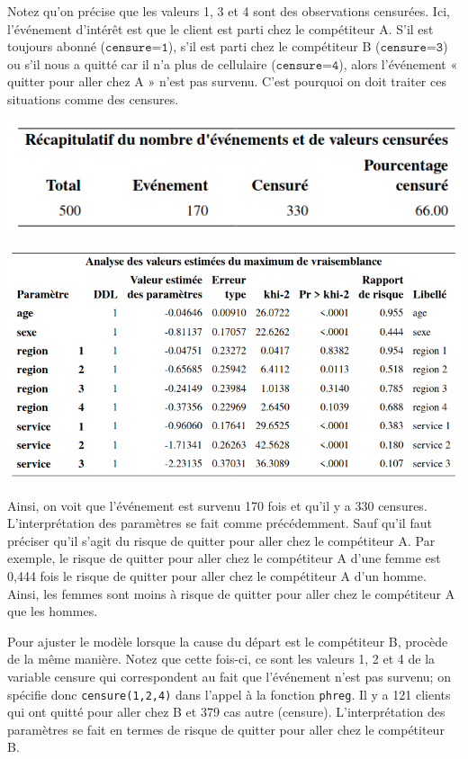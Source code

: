 \documentclass[
  11pt,
  letterpaper,
]{book}
\theoremstyle{definition}
\theoremstyle{definition}
\theoremstyle{definition}
\theoremstyle{definition}
\theoremstyle{remark}
\begin{document}
Notez qu'on précise que les valeurs 1, 3 et 4 sont des observations censurées. Ici, l'événement d'intérêt est que le client est parti chez le compétiteur A. S'il est toujours abonné (\(\texttt{censure=1}\)), s'il est parti chez le compétiteur B (\(\texttt{censure=3}\)) ou s'il nous a quitté car il n'a plus de cellulaire (\(\texttt{censure=4}\)), alors l'événement « quitter pour aller chez A » n'est pas survenu. C'est pourquoi on doit traiter ces situations comme des censures.

\begin{center}\includegraphics[width=0.65\linewidth]{figures/05-survie-e24} \end{center}

\begin{center}\includegraphics[width=0.85\linewidth]{figures/05-survie-e25} \end{center}

Ainsi, on voit que l'événement est survenu 170 fois et qu'il y a 330 censures. L'interprétation des paramètres se fait comme précédemment. Sauf qu'il faut préciser qu'il s'agit du risque de quitter pour aller chez le compétiteur A. Par exemple, le risque de quitter pour aller chez le compétiteur A d'une femme est 0,444 fois le risque de quitter pour aller chez le compétiteur A d'un homme. Ainsi, les femmes sont moins à risque de quitter pour aller chez le compétiteur A que les hommes.

Pour ajuster le modèle lorsque la cause du départ est le compétiteur B, procède de la même manière. Notez que cette fois-ci, ce sont les valeurs 1, 2 et 4 de la variable censure qui correspondent au fait que l'événement n'est pas survenu; on spécifie donc \texttt{censure(1,2,4)} dans l'appel à la fonction \texttt{phreg}. Il y a 121 clients qui ont quitté pour aller chez B et 379 cas autre (censure). L'interprétation des paramètres se fait en termes de risque de quitter pour aller chez le compétiteur B.
\end{document}
